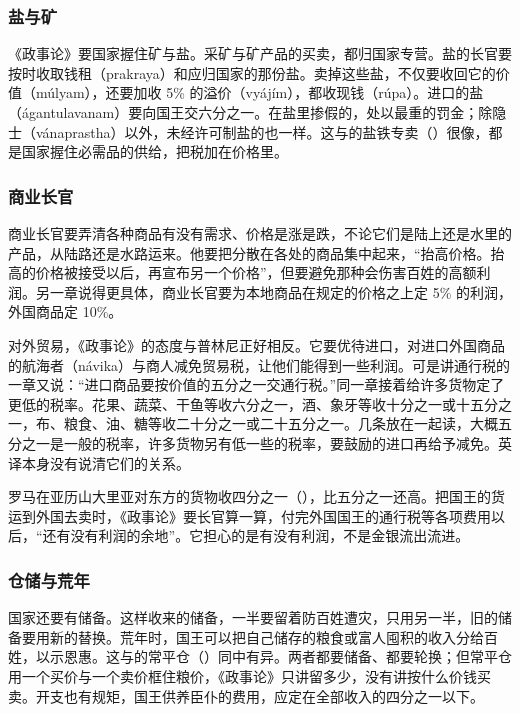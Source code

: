 \subsubsection{盐与矿}
《政事论》要国家握住矿与盐。采矿与矿产品的买卖，都归国家专营。盐的长官要按时收取钱租（prakraya）和应归国家的那份盐。卖掉这些盐，不仅要收回它的价值（múlyam），还要加收 5\% 的溢价（vyájím），都收现钱（rúpa）。进口的盐（ágantulavanam）要向国王交六分之一。在盐里掺假的，处以最重的罚金；除隐士（vánaprastha）以外，未经许可制盐的也一样\cite{arthashastra}。这与的盐铁专卖（）很像，都是国家握住必需品的供给，把税加在价格里。

\subsubsection{商业长官}
商业长官要弄清各种商品有没有需求、价格是涨是跌，不论它们是陆上还是水里的产品，从陆路还是水路运来。他要把分散在各处的商品集中起来，“抬高价格。抬高的价格被接受以后，再宣布另一个价格”，但要避免那种会伤害百姓的高额利润\cite{arthashastra}。另一章说得更具体，商业长官要为本地商品在规定的价格之上定 5\% 的利润，外国商品定 10\%\cite{arthashastra}。

对外贸易，《政事论》的态度与普林尼正好相反。它要优待进口，对进口外国商品的航海者（návika）与商人减免贸易税，让他们能得到一些利润\cite{arthashastra}。可是讲通行税的一章又说：“进口商品要按价值的五分之一交通行税。”\cite{arthashastra}同一章接着给许多货物定了更低的税率。花果、蔬菜、干鱼等收六分之一，酒、象牙等收十分之一或十五分之一，布、粮食、油、糖等收二十分之一或二十五分之一\cite{arthashastra}。几条放在一起读，大概五分之一是一般的税率，许多货物另有低一些的税率，要鼓励的进口再给予减免。英译本身没有说清它们的关系。

罗马在亚历山大里亚对东方的货物收四分之一（），比五分之一还高。把国王的货运到外国去卖时，《政事论》要长官算一算，付完外国国王的通行税等各项费用以后，“还有没有利润的余地”\cite{arthashastra}。它担心的是有没有利润，不是金银流出流进。

\subsubsection{仓储与荒年}
国家还要有储备。这样收来的储备，一半要留着防百姓遭灾，只用另一半，旧的储备要用新的替换\cite{arthashastra}。荒年时，国王可以把自己储存的粮食或富人囤积的收入分给百姓，以示恩惠\cite{arthashastra}。这与的常平仓（）同中有异。两者都要储备、都要轮换；但常平仓用一个买价与一个卖价框住粮价，《政事论》只讲留多少，没有讲按什么价钱买卖。开支也有规矩，国王供养臣仆的费用，应定在全部收入的四分之一以下\cite{arthashastra}。

